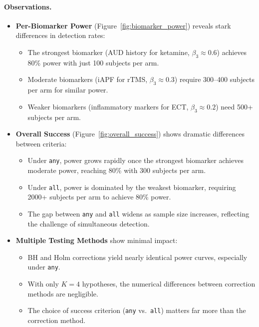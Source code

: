 \documentclass[11pt]{article}
\begin{document}
\paragraph{Observations.}
\begin{itemize}
\item \textbf{Per-Biomarker Power} (Figure~\ref{fig:biomarker_power}) reveals stark differences in detection rates:
  \begin{itemize}
  \item The strongest biomarker (AUD history for ketamine, $\beta_{3}\approx 0.6$) achieves 80\% power with just 100 subjects per arm.
  \item Moderate biomarkers (iAPF for rTMS, $\beta_{3}\approx 0.3$) require 300--400 subjects per arm for similar power.
  \item Weaker biomarkers (inflammatory markers for ECT, $\beta_{3}\approx 0.2$) need 500+ subjects per arm.
  \end{itemize}

\item \textbf{Overall Success} (Figure~\ref{fig:overall_success}) shows dramatic differences between criteria:
  \begin{itemize}
  \item Under \texttt{any}, power grows rapidly once the strongest biomarker achieves moderate power, reaching 80\% with 300 subjects per arm.
  \item Under \texttt{all}, power is dominated by the weakest biomarker, requiring 2000+ subjects per arm to achieve 80\% power.
  \item The gap between \texttt{any} and \texttt{all} widens as sample size increases, reflecting the challenge of simultaneous detection.
  \end{itemize}

\item \textbf{Multiple Testing Methods} show minimal impact:
  \begin{itemize}
  \item BH and Holm corrections yield nearly identical power curves, especially under \texttt{any}.
  \item With only $K=4$ hypotheses, the numerical differences between correction methods are negligible.
  \item The choice of success criterion (\texttt{any} vs.\ \texttt{all}) matters far more than the correction method.
  \end{itemize}
\end{itemize}
\end{document}
